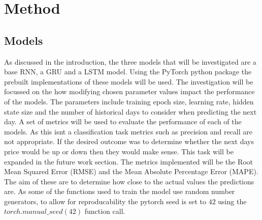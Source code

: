 \documentclass[10pt,twocolumn,letterpaper]{article}
\begin{document}
\section{Method}
\subsection{Models}
As discussed in the introduction, the three models that will be investigated are a 
base RNN, a GRU and a LSTM model. Using the PyTorch python package the prebuilt 
implementations of these models will be used. The investigation will be
focussed on the how modifying chosen parameter values impact the performance of the models.
The parameters include training epoch size, learning rate, hidden state size and the 
number of historical days to consider when predicting the next day. A set of metrics 
will be used to evaluate the performance of each of the models. As this isnt a 
classification task metrics such as precision and recall are not appropriate. If 
the desired outcome was to determine whether the next days price would be up or down 
then they would make sense. This task will be expanded in the future work section. The 
metrics implemented will be the Root Mean Squared Error (RMSE) and the Mean Absolute 
Percentage Error (MAPE). The aim of these are to determine how close to the actual 
values the predictions are. As some of the functions used to train the model use 
random number generators, to allow for reproducability the pytorch seed is set 
to $42$ using the $torch.manual\_seed(42)$ function call. 
\end{document}
